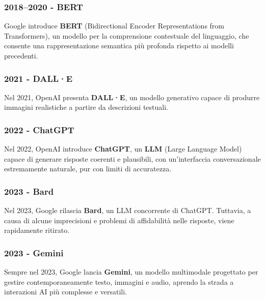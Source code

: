 \subsubsection{2018–2020 - BERT}

Google introduce \textbf{BERT} (Bidirectional Encoder Representations from Transformers), un modello per la comprensione contestuale del linguaggio, che consente una rappresentazione semantica più profonda rispetto ai modelli precedenti.

\subsubsection{2021 - DALL·E}

Nel 2021, OpenAI presenta \textbf{DALL·E}, un modello generativo capace di produrre immagini realistiche a partire da descrizioni testuali.

\subsubsection{2022 - ChatGPT}

Nel 2022, OpenAI introduce \textbf{ChatGPT}, un \textbf{LLM} (Large Language Model) capace di generare risposte coerenti e plausibili, con un’interfaccia conversazionale estremamente naturale, pur con limiti di accuratezza.

\subsubsection{2023 - Bard}

Nel 2023, Google rilascia \textbf{Bard}, un LLM concorrente di ChatGPT. Tuttavia, a causa di alcune imprecisioni e problemi di affidabilità nelle risposte, viene rapidamente ritirato.

\subsubsection{2023 - Gemini}

Sempre nel 2023, Google lancia \textbf{Gemini}, un modello multimodale progettato per gestire contemporaneamente testo, immagini e audio, aprendo la strada a interazioni AI più complesse e versatili.

